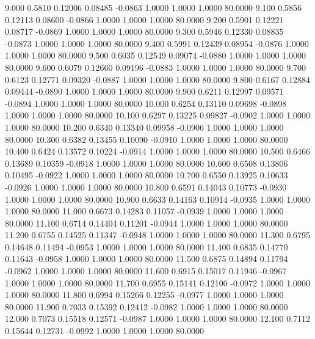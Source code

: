    9.000   0.5810   0.12006   0.08485  -0.0863   1.0000   1.0000   1.0000  80.0000
   9.100   0.5856   0.12113   0.08600  -0.0866   1.0000   1.0000   1.0000  80.0000
   9.200   0.5901   0.12221   0.08717  -0.0869   1.0000   1.0000   1.0000  80.0000
   9.300   0.5946   0.12330   0.08835  -0.0873   1.0000   1.0000   1.0000  80.0000
   9.400   0.5991   0.12439   0.08954  -0.0876   1.0000   1.0000   1.0000  80.0000
   9.500   0.6035   0.12549   0.09074  -0.0880   1.0000   1.0000   1.0000  80.0000
   9.600   0.6079   0.12660   0.09196  -0.0883   1.0000   1.0000   1.0000  80.0000
   9.700   0.6123   0.12771   0.09320  -0.0887   1.0000   1.0000   1.0000  80.0000
   9.800   0.6167   0.12884   0.09444  -0.0890   1.0000   1.0000   1.0000  80.0000
   9.900   0.6211   0.12997   0.09571  -0.0894   1.0000   1.0000   1.0000  80.0000
  10.000   0.6254   0.13110   0.09698  -0.0898   1.0000   1.0000   1.0000  80.0000
  10.100   0.6297   0.13225   0.09827  -0.0902   1.0000   1.0000   1.0000  80.0000
  10.200   0.6340   0.13340   0.09958  -0.0906   1.0000   1.0000   1.0000  80.0000
  10.300   0.6382   0.13455   0.10090  -0.0910   1.0000   1.0000   1.0000  80.0000
  10.400   0.6424   0.13572   0.10224  -0.0914   1.0000   1.0000   1.0000  80.0000
  10.500   0.6466   0.13689   0.10359  -0.0918   1.0000   1.0000   1.0000  80.0000
  10.600   0.6508   0.13806   0.10495  -0.0922   1.0000   1.0000   1.0000  80.0000
  10.700   0.6550   0.13925   0.10633  -0.0926   1.0000   1.0000   1.0000  80.0000
  10.800   0.6591   0.14043   0.10773  -0.0930   1.0000   1.0000   1.0000  80.0000
  10.900   0.6633   0.14163   0.10914  -0.0935   1.0000   1.0000   1.0000  80.0000
  11.000   0.6673   0.14283   0.11057  -0.0939   1.0000   1.0000   1.0000  80.0000
  11.100   0.6714   0.14404   0.11201  -0.0944   1.0000   1.0000   1.0000  80.0000
  11.200   0.6755   0.14525   0.11347  -0.0948   1.0000   1.0000   1.0000  80.0000
  11.300   0.6795   0.14648   0.11494  -0.0953   1.0000   1.0000   1.0000  80.0000
  11.400   0.6835   0.14770   0.11643  -0.0958   1.0000   1.0000   1.0000  80.0000
  11.500   0.6875   0.14894   0.11794  -0.0962   1.0000   1.0000   1.0000  80.0000
  11.600   0.6915   0.15017   0.11946  -0.0967   1.0000   1.0000   1.0000  80.0000
  11.700   0.6955   0.15141   0.12100  -0.0972   1.0000   1.0000   1.0000  80.0000
  11.800   0.6994   0.15266   0.12255  -0.0977   1.0000   1.0000   1.0000  80.0000
  11.900   0.7033   0.15392   0.12412  -0.0982   1.0000   1.0000   1.0000  80.0000
  12.000   0.7073   0.15518   0.12571  -0.0987   1.0000   1.0000   1.0000  80.0000
  12.100   0.7112   0.15644   0.12731  -0.0992   1.0000   1.0000   1.0000  80.0000
